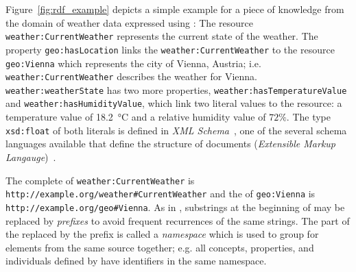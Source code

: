 Figure~\ref{fig:rdf_example} depicts a simple example for a piece of knowledge from the domain of weather data expressed using : The resource \texttt{weather:\hspace{0pt}Current\hspace{0pt}Weather} represents the current state of the weather. The property \texttt{geo:\hspace{0pt}has\hspace{0pt}Location} links the \texttt{weather:\hspace{0pt}Current\hspace{0pt}Weather} to the resource \texttt{geo:\hspace{0pt}Vienna} which represents the city of Vienna, Austria; i.e. \texttt{weather:\hspace{0pt}Current\hspace{0pt}Weather} describes the weather for Vienna. \texttt{weather:\hspace{0pt}weather\hspace{0pt}State} has two more properties, \texttt{weather:\hspace{0pt}has\hspace{0pt}Temperature\hspace{0pt}Value} and \texttt{weather:\hspace{0pt}has\hspace{0pt}Humidity\hspace{0pt}Value}, which link two literal values to the resource: a temperature value of \SI{18.2}{\celsius} and a relative humidity value of $72 \%$.
The type \texttt{xsd:\hspace{0pt}float} of both literals is defined in \emph{XML Schema}~\cite{xml-schema,xml-schema-datatypes}, one of the several  schema languages available that define the structure of  documents (\emph{Extensible Markup Langauge})~\cite{XML}.

The complete  of \texttt{weather:\hspace{0pt}Current\hspace{0pt}Weather} is \texttt{http://example.org/\hspace{0pt}weather\#\hspace{0pt}CurrentWeather} and the  of \texttt{geo:\hspace{0pt}Vienna} is \texttt{http://example.org/geo\#Vienna}. As in , substrings at the beginning of  may be replaced by \emph{prefixes} to avoid frequent recurrences of the same strings. The part of the  replaced by the prefix is called a \emph{namespace} which is used to group  for elements from the same source together; e.g. all concepts, properties, and individuals defined by \smarthomeweather have identifiers in the same namespace.


